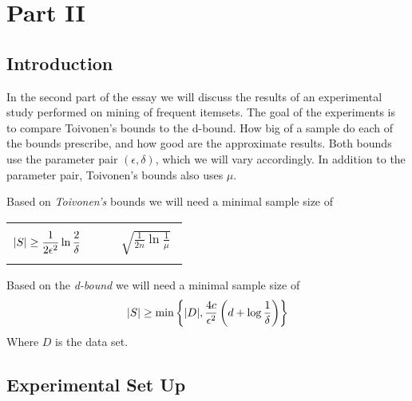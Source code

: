 \documentclass[../main.tex]{subfiles}
\begin{document}

\section*{Part II}
\setcounter{section}{2}
\setcounter{subsection}{0}

\subsection{Introduction}
\label{sec:II_intro}

In the second part of the essay we will discuss the results of an experimental study performed on mining of frequent itemsets.
The goal of the experiments is to compare Toivonen's bounds to the d-bound.
How big of a sample do each of the bounds prescribe, and how good are the approximate results.
Both bounds use the parameter pair $(\epsilon, \delta)$, which we will vary accordingly.
In addition to the parameter pair, Toivonen's bounds also uses $\mu$.

Based on \emph{Toivonen's} bounds we will need a minimal sample size of

\begin{tabularx}{\textwidth}{X X}
    {\begin{align}
        &\lvert S\rvert \ge \frac{1}{2\epsilon^{2}} \ln \frac{2}{\delta}
    \end{align}}
     & 
    {\begin{align}
        &\sqrt{\frac{1}{2n}\ln\frac{1}{\mu}}
    \end{align}}
\end{tabularx}

Based on the \emph{d-bound} we will need a minimal sample size of
\begin{align}
    \lvert S\rvert \ge \min \left\{ \lvert D\rvert, \frac{4c}{\epsilon^{2}}\left( d + \log \frac{1}{\delta} \right) \right\}
\end{align}
Where $D$ is the data set.

\subsection{Experimental Set Up}
\label{sec:II_setup}
\end{document}
